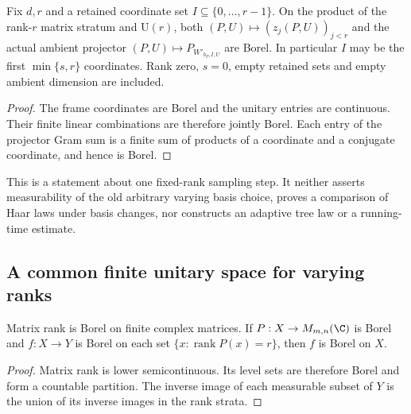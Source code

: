 \begin{lemma}
    \label{lem:joint_borel_canonical_sample_projector}
    \leanok
    Fix $d,r$ and a retained coordinate set $I\subseteq\{0,\ldots,r-1\}$.
    On the product of the rank-$r$ matrix stratum and $\mathrm U(r)$,
    both $(P,U)\mapsto(z_j(P,U))_{j<r}$ and the actual ambient projector
    $(P,U)\mapsto P_{W'_{b_P,I,U}}$ are Borel.
    In particular $I$ may be the first $\min\{s,r\}$ coordinates.
    Rank zero, $s=0$, empty retained sets and empty ambient dimension
    are included.
\end{lemma}
\begin{proof}\leanok
    The frame coordinates are Borel and the unitary entries are continuous.
    Their finite linear combinations are therefore jointly Borel. Each
    entry of the projector Gram sum is a finite sum of products of a
    coordinate and a conjugate coordinate, and hence is Borel.
\end{proof}

This is a statement about one fixed-rank sampling step. It neither asserts
measurability of the old arbitrary varying basis choice, proves a comparison
of Haar laws under basis changes, nor constructs an adaptive tree law or a
running-time estimate.

\subsection{A common finite unitary space for varying ranks}

\begin{lemma}
    \label{lem:borel_matrix_rank_gluing}
    \leanok
    Matrix rank is Borel on finite complex matrices. If $P:X\to M_{m,n}(\C)$
    is Borel and $f:X\to Y$ is Borel on each set
    $\{x:\operatorname{rank}P(x)=r\}$, then $f$ is Borel on $X$.
\end{lemma}
\begin{proof}\leanok
    Matrix rank is lower semicontinuous. Its level sets are therefore
    Borel and form a countable partition. The inverse image of each
    measurable subset of $Y$ is the union of its inverse images in the
    rank strata.
\end{proof}


